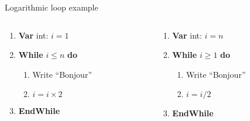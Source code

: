 \documentclass[english,10pt,table]{beamer}
\begin{document}
\begin{frame}{Logarithmic loop example}
  \begin{columns}
  \begin{column}{0.48\textwidth}
   \begin{block}{}\small				
			\begin{enumerate}[1.]\small				
		   \item \textbf{Var} int: \alert{$i=1$}
     \item \textbf{While} \alert{$i \leq n$} \textbf{do}
					 \begin{enumerate}[1.]\small				
       \item Write ``Bonjour'' 
							\item \alert{$i = i \times 2$}
						\end{enumerate}
					\item \textbf{EndWhile}
			\end{enumerate}
   \end{block}
	  \end{column}
			\pause
   \begin{column}{0.48\textwidth}
    \begin{block}{}\small				
			\begin{enumerate}[1.]\small				
		   \item \textbf{Var} int: \alert{$i=n$}
     \item \textbf{While} \alert{$i \geq 1$} \textbf{do}
					 \begin{enumerate}[1.]\small				
       \item Write ``Bonjour'' 
							\item \alert{$i = i / 2$}
						\end{enumerate}
					\item \textbf{EndWhile}
			\end{enumerate}
   \end{block}
  \end{column}
  \end{columns}
		
\end{frame}
\end{document}
